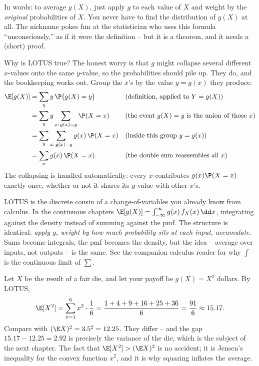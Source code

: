 In words: to average $g(X)$, just apply $g$ to each value of $X$ and weight by the
\emph{original} probabilities of $X$. You never have to find the distribution of
$g(X)$ at all. The nickname pokes fun at the statistician who uses this formula
``unconsciously,'' as if it were the definition -- but it is a theorem, and it
needs a (short) proof.

\begin{whybox}
Why is LOTUS true? The honest worry is that $g$ might collapse several different
$x$-values onto the same $y$-value, so the probabilities should pile up. They do,
and the bookkeeping works out. Group the $x$'s by the value $y=g(x)$ they produce:
\begin{align*}
  \E[g(X)] &= \sum_y y\,\P\bigl(g(X)=y\bigr) && \text{(definition, applied to } Y=g(X))\\
           &= \sum_y y \sum_{x:\,g(x)=y} \P(X=x) && \text{(the event } g(X)=y \text{ is the union of those } x)\\
           &= \sum_y \sum_{x:\,g(x)=y} g(x)\,\P(X=x) && \text{(inside this group } y=g(x))\\
           &= \sum_x g(x)\,\P(X=x). && \text{(the double sum reassembles all } x)
\end{align*}
The collapsing is handled automatically: every $x$ contributes $g(x)\P(X=x)$
exactly once, whether or not it shares its $g$-value with other $x$'s.
\end{whybox}

\begin{connectionbox}
LOTUS is the discrete cousin of a change-of-variables you already know from
calculus. In the continuous chapters $\E[g(X)] = \int_{-\infty}^{\infty}
g(x)\,f_X(x)\,\dd x$, integrating against the density instead of summing against
the pmf. The structure is identical: \emph{apply $g$, weight by how much
probability sits at each input, accumulate}. Sums become integrals, the pmf
becomes the density, but the idea -- average over inputs, not outputs -- is the
same. See the companion calculus reader for why $\int$ is the continuous limit of
$\sum$.
\end{connectionbox}

\begin{example}
\label{ch08:ex-lotus}
Let $X$ be the result of a fair die, and let your payoff be $g(X) = X^2$ dollars.
By LOTUS,
\[
  \E[X^2] = \sum_{x=1}^6 x^2 \cdot \frac16
          = \frac{1 + 4 + 9 + 16 + 25 + 36}{6} = \frac{91}{6} \approx 15.17.
\]
Compare with $(\E X)^2 = 3.5^2 = 12.25$. They differ -- and the gap $15.17 -
12.25 = 2.92$ is precisely the variance of the die, which is the subject of the
next chapter. The fact that $\E[X^2] > (\E X)^2$ is no accident; it is Jensen's
inequality for the convex function $x^2$, and it is why squaring inflates the
average.
\end{example}

